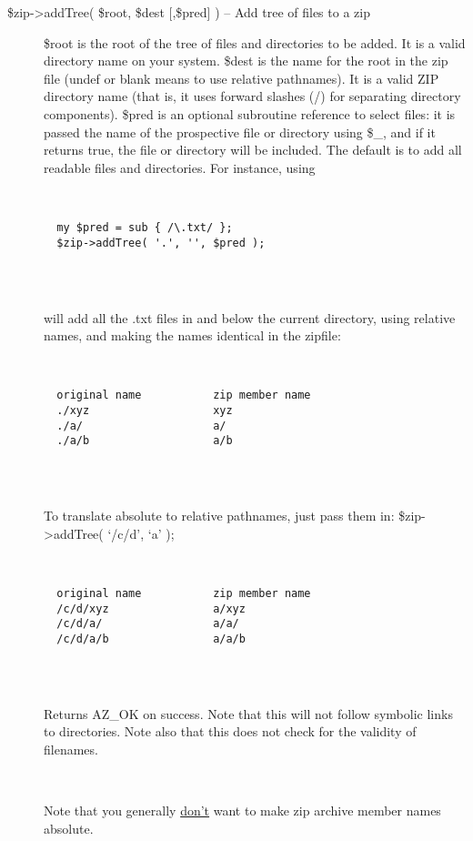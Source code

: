 \documentclass[]{article}
\renewcommand{\emph}[1]{\underline{#1}}
\begin{document}
\begin{description}
\item[\$zip-\textgreater{}addTree( \$root, \$dest {[},\$pred{]} ) -- Add
tree of files to a zip]
\$root is the root of the tree of files and directories to be added. It
is a valid directory name on your system. \$dest is the name for the
root in the zip file (undef or blank means to use relative pathnames).
It is a valid ZIP directory name (that is, it uses forward slashes (/)
for separating directory components). \$pred is an optional subroutine
reference to select files: it is passed the name of the prospective file
or directory using \$\_, and if it returns true, the file or directory
will be included. The default is to add all readable files and
directories. For instance, using

~

\begin{verbatim}
  my $pred = sub { /\.txt/ };
  $zip->addTree( '.', '', $pred );
    
\end{verbatim}

~

will add all the .txt files in and below the current directory, using
relative names, and making the names identical in the zipfile:

~

\begin{verbatim}
  original name           zip member name
  ./xyz                   xyz
  ./a/                    a/
  ./a/b                   a/b
    
\end{verbatim}

~

To translate absolute to relative pathnames, just pass them in:
\$zip-\textgreater{}addTree( `/c/d', `a' );

~

\begin{verbatim}
  original name           zip member name
  /c/d/xyz                a/xyz
  /c/d/a/                 a/a/
  /c/d/a/b                a/a/b
    
\end{verbatim}

~

Returns AZ\_OK on success. Note that this will not follow symbolic links
to directories. Note also that this does not check for the validity of
filenames.

~

Note that you generally \emph{don't} want to make zip archive member
names absolute.
\end{description}
\end{document}
